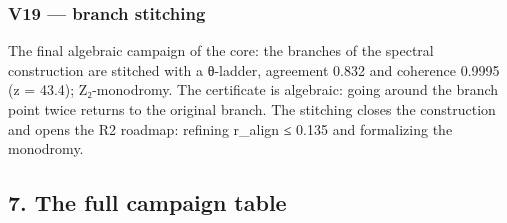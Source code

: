 \documentclass[11pt,a4paper]{article}
\begin{document}
\subsubsection{V19 — branch stitching}

The final algebraic campaign of the core: the branches of the spectral construction are stitched with a θ-ladder, agreement 0.832 and coherence 0.9995 (z = 43.4); Z₂-monodromy. The certificate is algebraic: going around the branch point twice returns to the original branch. The stitching closes the construction and opens the R2 roadmap: refining r\_align ≤ 0.135 and formalizing the monodromy.

\subsection{7. The full campaign table}
\end{document}
